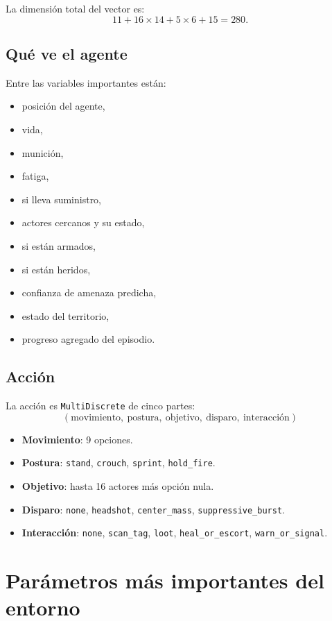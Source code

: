 \documentclass[11pt]{article}
\begin{document}
La dimensión total del vector es:
\[
11 + 16 \times 14 + 5 \times 6 + 15 = 280.
\]

\subsection{Qué ve el agente}
Entre las variables importantes están:
\begin{itemize}
    \item posición del agente,
    \item vida,
    \item munición,
    \item fatiga,
    \item si lleva suministro,
    \item actores cercanos y su estado,
    \item si están armados,
    \item si están heridos,
    \item confianza de amenaza predicha,
    \item estado del territorio,
    \item progreso agregado del episodio.
\end{itemize}

\subsection{Acción}
La acción es \texttt{MultiDiscrete} de cinco partes:
\[
(\text{movimiento},\ \text{postura},\ \text{objetivo},\ \text{disparo},\ \text{interacción})
\]

\begin{itemize}
    \item \textbf{Movimiento}: 9 opciones.
    \item \textbf{Postura}: \texttt{stand}, \texttt{crouch}, \texttt{sprint}, \texttt{hold\_fire}.
    \item \textbf{Objetivo}: hasta 16 actores más opción nula.
    \item \textbf{Disparo}: \texttt{none}, \texttt{headshot}, \texttt{center\_mass}, \texttt{suppressive\_burst}.
    \item \textbf{Interacción}: \texttt{none}, \texttt{scan\_tag}, \texttt{loot}, \texttt{heal\_or\_escort}, \texttt{warn\_or\_signal}.
\end{itemize}

\section{Parámetros más importantes del entorno}
\end{document}
